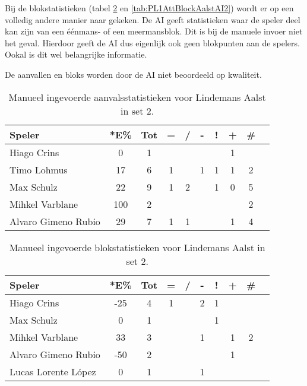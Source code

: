 Bij de blokstatistieken (tabel \ref{tab:PL1BlockAalstMan2} en \ref{tab:PL1AttBlockAalstAI2}) wordt er op een volledig andere manier naar gekeken. De AI geeft statistieken waar de speler deel kan zijn van een éénmans- of een meermansblok. Dit is bij de manuele invoer niet het geval. Hierdoor geeft de AI dus eigenlijk ook geen blokpunten aan de spelers. Ookal is dit wel belangrijke informatie.

De aanvallen en bloks worden door de AI niet beoordeeld op kwaliteit.

\begin{table}[ht!]
  \centering
  \scriptsize
    \begin{tabular}{|l|c|c|c|c|c|c|c|c|c|}
      \hline
      \textbf{Speler} & *E\% & Tot & = & / & - & ! & + & \# \\ \hline
      Hiago Crins  & 0 & 1 &  &  &  &  & 1 &  \\ 
      Timo Lohmus  & 17 & 6 & 1 &  & 1 & 1 & 1 & 2 \\ 
      Max Schulz  & 22 & 9 & 1 & 2 &  & 1 & 0 & 5\\
      Mihkel Varblane  & 100 & 2 &  &  &  &  &  & 2 \\ 
      Alvaro Gimeno Rubio & 29 & 7 & 1 & 1 &  &  & 1 & 4 \\ \hline 
  \end{tabular}
\caption[Manueel ingevoerde aanvalsstatistieken voor Lindemans Aalst in set 2]{\label{tab:PL1AttAalstMan2}Manueel ingevoerde aanvalsstatistieken voor Lindemans Aalst in set 2.}
\end{table}

\begin{table}[ht!]
  \centering
  \scriptsize
    \begin{tabular}{|l|c|c|c|c|c|c|c|c|c|}
      \hline
      \textbf{Speler} & *E\% & Tot & = & / & - & ! & + & \# \\ \hline
      Hiago Crins & -25 & 4 & 1 &  & 2 & 1 &  &  \\ 
      Max Schulz & 0 & 1 &  &  &  & 1 &  & \\
      Mihkel Varblane & 33 & 3 &  &  & 1 &  & 1 & 2 \\
      Alvaro Gimeno Rubio & -50 & 2 &  & &  &  & 1 &  \\
      Lucas Lorente López & 0 & 1 &  &  & 1 &  &  &  \\ \hline
  \end{tabular}
\caption[Manueel ingevoerde blokstatistieken voor Lindemans Aalst in set 2]{\label{tab:PL1BlockAalstMan2}Manueel ingevoerde blokstatistieken voor Lindemans Aalst in set 2.}
\end{table}

